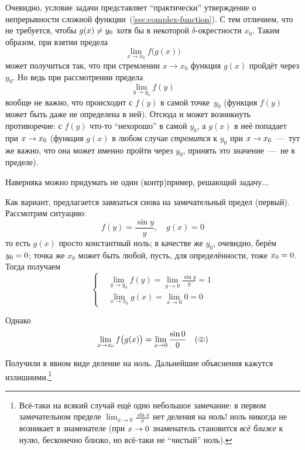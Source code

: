 \documentclass[a4paper,12pt]{article}
\begin{document}
  \begin{solution}
    Очевидно, условие задачи представляет ``практически'' утверждение о непрерывности сложной функции~(\ref{sec:complex-function}).
    С тем отличием, что не требуется, чтобы $g(x) \hm{\not=} y_0$ хотя бы в некоторой $\delta$-окрестности $x_0$.
    Таким образом, при взятии предела
    \[
      \lim_{x \to x_0} f\bigl(g(x)\bigr)
    \]
    может получиться так, что при стремлении $x \to x_0$ функция $g(x)$ пройдёт через $y_0$.
    Но ведь при рассмотрении предела
    \[
      \lim_{y \to y_0} f(y)
    \]
    вообще не важно, что происходит с $f(y)$ в самой точке~$y_0$ (функция $f(y)$ может быть даже не определена в ней).
    Отсюда и может возникнуть противоречие: с $f(y)$ что-то ``нехорошо'' в самой $y_0$, а $g(x)$ в неё попадает при $x \hm\to x_0$ (функция $g(x)$ в любом случае \emph{стремится} к $y_0$ при $x \hm\to x_0$~---~тут же важно, что она может именно пройти через $y_0$, принять это значение~---~не в пределе).

    Наверняка можно придумать не один (контр)пример, решающий задачу...

    Как вариант, предлагается завязаться снова на замечательный предел (первый).
    Рассмотрим ситуацию:
    \[
      f(y) = \frac{\sin y}{y}, \quad g(x) = 0
    \]
    то есть $g(x)$ просто константный ноль; в качестве же $y_0$, очевидно, берём $y_0 \hm= 0$;
    точка же $x_0$ может быть любой, пусть, для определённости, тоже $x_0 \hm= 0$.
    Тогда получаем
    \[
      \left\{\begin{aligned}
        &\lim_{y \to y_0} f(y) = \lim_{y \to 0} \frac{\sin y}{y} = 1\\
        &\lim_{x \to x_0} g(x) = \lim_{x \to 0} 0 = 0
      \end{aligned}\right.
    \]

    Однако
    \[
      \lim_{x \to x_0} f\bigl(g(x)\bigr) = \lim_{x \to 0} \frac{\sin 0}{0} \quad (\pumpkin)
    \]

    Получили в явном виде деление на ноль.
    Дальнейшие объяснения кажутся излишними.\footnote{
      Всё-таки на всякий случай ещё одно небольшое замечание: в первом замечательном пределе $\lim_{x \to 0} \frac{\sin x}{x}$ нет деления на ноль! ноль никогда не возникает в знаменателе (при $x \hm\to 0$ знаменатель становится \emph{всё ближе} к нулю, бесконечно близко, но всё-таки не ``чистый'' ноль).
    }
  \end{solution}



\end{document}

